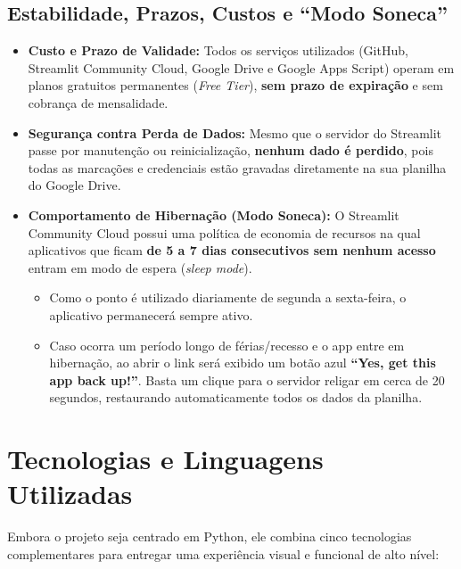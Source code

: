 \documentclass[11pt,a4paper]{article}
\begin{document}
\subsection{Estabilidade, Prazos, Custos e ``Modo Soneca''}
\begin{itemize}[leftmargin=1.5em]
    \item \textbf{Custo e Prazo de Validade:} Todos os serviços utilizados (GitHub, Streamlit Community Cloud, Google Drive e Google Apps Script) operam em planos gratuitos permanentes (\textit{Free Tier}), \textbf{sem prazo de expiração} e sem cobrança de mensalidade.
    \item \textbf{Segurança contra Perda de Dados:} Mesmo que o servidor do Streamlit passe por manutenção ou reinicialização, \textbf{nenhum dado é perdido}, pois todas as marcações e credenciais estão gravadas diretamente na sua planilha do Google Drive.
    \item \textbf{Comportamento de Hibernação (Modo Soneca):} O Streamlit Community Cloud possui uma política de economia de recursos na qual aplicativos que ficam \textbf{de 5 a 7 dias consecutivos sem nenhum acesso} entram em modo de espera (\textit{sleep mode}).
    \begin{itemize}
        \item Como o ponto é utilizado diariamente de segunda a sexta-feira, o aplicativo permanecerá sempre ativo.
        \item Caso ocorra um período longo de férias/recesso e o app entre em hibernação, ao abrir o link será exibido um botão azul \textbf{``Yes, get this app back up!''}. Basta um clique para o servidor religar em cerca de 20 segundos, restaurando automaticamente todos os dados da planilha.
    \end{itemize}
\end{itemize}

\section{Tecnologias e Linguagens Utilizadas}

Embora o projeto seja centrado em Python, ele combina cinco tecnologias complementares para entregar uma experiência visual e funcional de alto nível:
\end{document}

